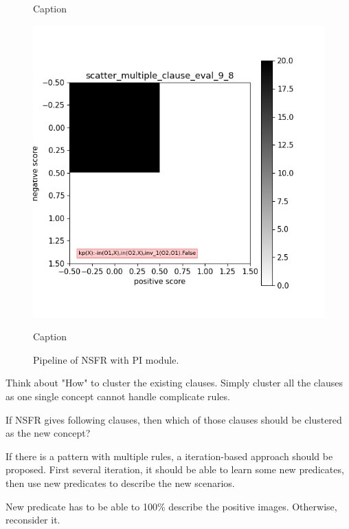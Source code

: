 \documentclass[
]{ceurart}
\begin{document}
\begin{figure}[h]
\begin{minipage}[b]{.3\textwidth}
		\caption{Caption}\label{label-h}
	\end{minipage}
	\begin{minipage}[b]{.3\textwidth}
		\includegraphics[width=\textwidth]{img/mce/mce-8.png}
		\caption{Caption}\label{label-i}
	\end{minipage}
	\caption{Pipeline of NSFR with PI module.}
	\label{fig:mce}
\end{figure}



Think about "How" to cluster the existing clauses. Simply cluster all the clauses as one single concept cannot handle complicate rules.

If NSFR gives following clauses, then which of those clauses should be clustered as the new concept?

If there is a pattern with multiple rules,
a iteration-based approach should be proposed.
First several iteration, it should be able to learn some new predicates, then use new predicates to describe the new scenarios.

New predicate has to be able to 100\% describe the positive images. Otherwise, reconsider it.
\end{document}
